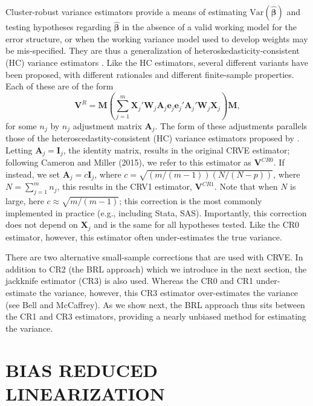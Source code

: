\documentclass[12pt]{article}
\newcommand{\Var}{\text{Var}}
\newcommand{\bm}{\mathbf}
\newcommand{\bs}{\boldsymbol}
\begin{document}
Cluster-robust variance estimators provide a means of estimating $\Var\left(\bs{\hat\beta}\right)$ and testing hypotheses regarding $\hat{\bs\beta}$ in the absence of a valid working model for the error structure, or when the working variance model used to develop weights may be mis-specified. 
They are thus a generalization of heteroskedasticity-consistent (HC) variance estimators \citep{MacKinnon1985some}. 
Like the HC estimators, several different variants have been proposed, with different rationales and different finite-sample properties. Each of these are of the form
\begin{equation}
\label{eq:V_small}
\bm{V}^{R} = \bm{M}\left(\sum_{j=1}^m \bm{X}_j'\bm{W}_j \bm{A}_j \bm{e}_j \bm{e}_j' \bm{A}_j' \bm{W}_j \bm{X}_j\right) \bm{M},
\end{equation}
for some $n_j$ by $n_j$ adjustment matrix $\bm{A}_j$. The form of these adjustments parallels those of the heteroscedastity-consistent (HC) variance estimators proposed by \citet{MacKinnon1985some}. Letting $\bm{A}_j = \bm{I}_j$, the identity matrix, results in the original CRVE estimator; following Cameron and Miller (2015), we refer to this estimator as $\bm{V}^{CR0}$. If instead, we set $\bm{A}_j = c\bm{I}_j$, where $c = \sqrt{(m/(m-1))(N/(N - p))}$, where $N = \sum_{j=1}^m n_j$, this results in the CRV1 estimator, $\bm{V}^{CR1}$. Note that when $N$ is large, here $c \approx \sqrt{m/(m-1)}$; this correction is the most commonly implemented in practice (e.g., including Stata, SAS). Importantly, this correction does not depend on $\bm{X}_j$ and is the same for all hypotheses tested. Like the CR0 estimator, however, this estimator often under-estimates the true variance.

There are two alternative small-sample corrections that are used with CRVE. In addition to CR2 (the BRL approach) which we introduce in the next section, the jackknife estimator (CR3) is also used. Whereas the CR0 and CR1 under-estimate the variance, however, this CR3 estimator over-estimates the variance (see Bell and McCaffrey).
As we show next, the BRL approach thus sits between the CR1 and CR3 estimators, providing a nearly unbiased method for estimating the variance. 


\section{BIAS REDUCED LINEARIZATION}
\label{sec:BRL}
\end{document}
